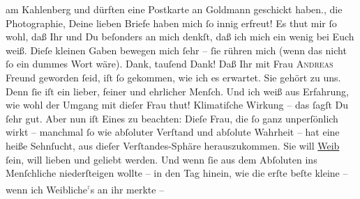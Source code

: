 \begin{ledgroupsized}[t]{13cm}
{{{                  am Kahlenberg und dürften eine Postkarte an
                     Goldmann geschickt haben.}}}\label{K_L02735-5h}, die
               Photographie, Deine lieben Briefe haben mich ſo innig erfreut! Es thut mir ſo wohl,
               daß Ihr und Du beſonders an mich denkſt, daß ich mich ein wenig bei Euch weiß. Dieſe
               kleinen Gaben bewegen mich ſehr – ſie rühren mich (wenn das nicht {\pb}ſo ein dummes Wort wäre). Dank, tauſend Dank!\pend
           \pstart
           Daß Ihr mit Frau \textsc{Andreas} Freund geworden ſeid, iſt ſo gekommen, wie ich es erwartet. Sie gehört zu uns.
               Denn ſie iſt ein lieber, feiner und ehrlicher Menſch. Und ich weiß aus Erfahrung, wie wohl der Umgang mit
               dieſer Frau thut!
               Klimatiſche Wirkung – das ſagſt Du ſehr gut. Aber nun iſt Eines zu beachten: {\pb}Dieſe Frau, die ſo ganz unperſönlich wirkt – manchmal ſo wie
               abſoluter Verſtand und abſolute Wahrheit – hat eine heiße Sehnſucht, aus dieſer
               Verſtandes-Sphäre herauszukommen. Sie will \uline{Weib} ſein,
               will lieben und geliebt werden. Und wenn ſie aus dem Abſoluten ins Menſchliche
               niederſteigen wollte – in den Tag hinein, wie  die
               erſte beſte kleine {\pb}\label{K_L02735-6v}\label{K_L02735-6h} – wenn ich Weibliche\substVorne{}\textsuperscript{\textcolor{gray}{r}}\substDazwischen{}s\substHinten{} an ihr merkte – \label{K_L02735-7v}
\end{ledgroupsized}
